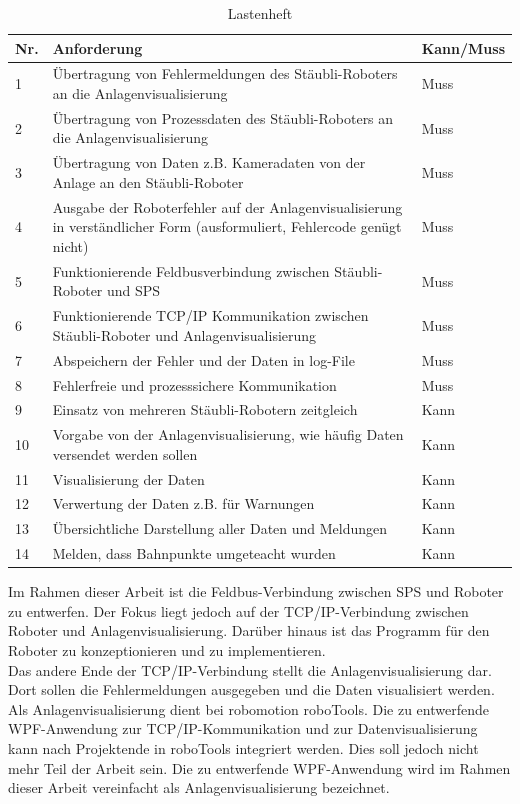 \documentclass[ a4paper,
                oneside,
                toc=bibliography,
                toc=listof
                ]{scrbook}
\begin{document}
	\begin{longtable}{p{0.5cm}p{10.5cm}p{2cm}}
		\caption{Lastenheft}
		\label{table:Lastenheft}\\
		\hline
		Nr. & Anforderung & Kann/Muss \\ [0.5ex] 
		\hline
		\endhead
		1 & Übertragung von Fehlermeldungen des Stäubli-Roboters an die Anlagenvisualisierung & Muss  \\ 
		2 & Übertragung von Prozessdaten des Stäubli-Roboters an die Anlagenvisualisierung & Muss  \\
		3 & Übertragung von Daten z.B. Kameradaten von der Anlage an den Stäubli-Roboter & Muss  \\
		4 & Ausgabe der Roboterfehler auf der Anlagenvisualisierung in verständlicher Form (ausformuliert, Fehlercode genügt nicht) & Muss  \\
		5 & Funktionierende Feldbusverbindung zwischen Stäubli-Roboter und SPS & Muss  \\
		6 & Funktionierende TCP/IP Kommunikation zwischen Stäubli-Roboter und Anlagenvisualisierung & Muss  \\  
		7 & Abspeichern der Fehler und der Daten in log-File & Muss  \\ 
		8 & Fehlerfreie und prozesssichere Kommunikation & Muss  \\ 
		9 & Einsatz von mehreren Stäubli-Robotern zeitgleich  & Kann  \\
		10 & Vorgabe von der Anlagenvisualisierung, wie häufig Daten versendet werden sollen & Kann  \\ 
		11 & Visualisierung der Daten & Kann  \\
		12 & Verwertung der Daten z.B. für Warnungen & Kann  \\  
		13 & Übersichtliche Darstellung aller Daten und Meldungen & Kann  \\ 
		14 & Melden, dass Bahnpunkte umgeteacht wurden & Kann  \\ 
		\hline
	\end{longtable}
	\noindent Im Rahmen dieser Arbeit ist die Feldbus-Verbindung zwischen SPS und Roboter zu entwerfen. Der Fokus liegt jedoch auf der TCP/IP-Verbindung zwischen Roboter und Anlagenvisualisierung. Darüber hinaus ist das Programm für den Roboter zu konzeptionieren und zu implementieren.\\
	Das andere Ende der TCP/IP-Verbindung stellt die Anlagenvisualisierung dar. Dort sollen die Fehlermeldungen ausgegeben und die Daten visualisiert werden. Als Anlagenvisualisierung dient bei robomotion roboTools. Die zu entwerfende WPF-Anwendung zur TCP/IP-Kommunikation und zur Datenvisualisierung kann nach Projektende in roboTools integriert werden. Dies soll jedoch nicht mehr Teil der Arbeit sein. Die zu entwerfende WPF-Anwendung wird im Rahmen dieser Arbeit vereinfacht als Anlagenvisualisierung bezeichnet.\\
\end{document}
